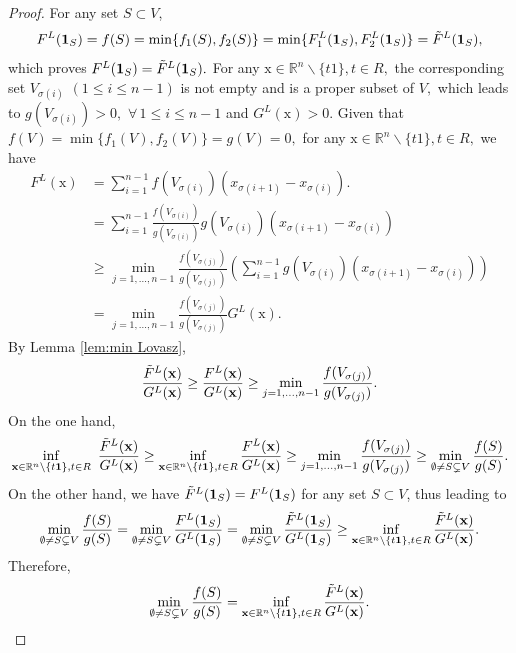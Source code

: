 \documentclass[10pt,a4paper]{amsart}
\providecommand{\vx}{\ensuremath{\vec{x}}}
\renewcommand{\vec}[1]{\boldsymbol{\mathrm{#1}}}
\begin{document}
\begin{proof}

For any set $S\subset V$, 
$$F^L(\mathbf{1}_S) = f(S)=\min\{f_1(S),f_2(S)\} =\min\{ F_1^L(\mathbf{1}_S),F_2^L(\mathbf{1}_S)\}=\Tilde{F}^L(\mathbf{1}_S),$$
which proves $F^L(\mathbf{1}_S) =\Tilde{F}^L(\mathbf{1}_S).$
For any $\vx \in \mathbb{R}^n \backslash \{t \vec 1\}, t \in R,$ the corresponding set $V_{\sigma(i)}$ $(1\leq i \leq n-1)$ is not empty and is a proper subset of $V,$ which leads to $g(V_{\sigma(i)})>0,$ $\forall \, 1\leq i \leq n-1$ and $G^L(\vx)>0.$
Given that $f(V)=\min\{f_1(V),f_2(V)\}= g(V)=0,$  for any $\vx \in \mathbb{R}^n \backslash \{t \vec 1\}, t \in R,$ we have
\begin{align*}
F^L(\vx)&=\sum_{i=1}^{n-1} f(V_{\sigma(i)})\left(x_{\sigma(i+1)}-x_{\sigma(i)}\right).\\
&=\sum_{i=1}^{n-1}\frac{f(V_{\sigma(i)})}{g(V_{\sigma(i)})}g(V_{\sigma(i)})\left(x_{\sigma(i+1)}-x_{\sigma(i)}\right) \\
&\geq\min_{j=1,...,n-1}\frac{f(V_{\sigma(j)})}{g(V_{\sigma(j)})}\left(\sum_{i=1}^{n-1}g(V_{\sigma(i)}) (x_{\sigma(i+1)}-x_{\sigma(i)})\right)\\
&=\min_{j=1,...,n-1}\frac{f(V_{\sigma(j)})}{g(V_{\sigma(j)})} G^L(\vx).
\end{align*}
By Lemma \ref{lem:min Lovasz},
\begin{equation*}
\frac{\Tilde{F}^L(\vx)}{G^L(\vx)}\geq 
\frac{F^L(\vx)}{G^L(\vx)}\geq \min\limits_{j=1,...,n-1} \frac{f(V_{\sigma(j)})}{g(V_{\sigma(j)})}.
\end{equation*}
On the one hand,
$$\inf_{\vx \in \mathbb{R}^n \backslash \{ t \vec 1\}, t \in R}\ \frac{\Tilde{F}^L(\vx)}{G^L(\vx)}\geq
\inf_{\vx \in \mathbb{R}^n \backslash \{ t \vec 1\}, t \in R}\frac{F^L(\vx)}{G^L(\vx)}
\geq\min\limits_{j=1,...,n-1} \frac{f(V_{\sigma(j)})}{g(V_{\sigma(j)})}
\geq\min_{\emptyset \neq S \subsetneq V}\frac{f(S)}{g(S)}. $$
On the other hand, we have $\Tilde{F}^L(\mathbf{1}_S)=F^L(\mathbf{1}_S)$ for any set $S\subset V$, thus leading to
$$\min_{\emptyset \neq S \subsetneq V}\frac{f(S)}{ g(S)}
=\min_{\emptyset \neq S \subsetneq V}\frac{F^L(\mathbf{1}_S)}{G^L(\mathbf{1}_S)}
=\min_{\emptyset \neq S \subsetneq V}\frac{\Tilde{F}^L(\mathbf{1}_S)}{G^L(\mathbf{1}_S)}
\geq\inf_{\vx \in \mathbb{R}^n \backslash \{ t \vec 1\}, t \in R}\frac{\Tilde{F}^L(\vx)}{G^L(\vx)}.$$
Therefore,
$$\min_{\emptyset \neq S \subsetneq V}\frac{f(S)}{ g(S)}
=\inf_{\vx \in \mathbb{R}^n \backslash \{ t \vec 1\}, t \in R}\frac{\Tilde{F}^L(\vx)}{G^L(\vx)}. $$
\end{proof}
\end{document}
